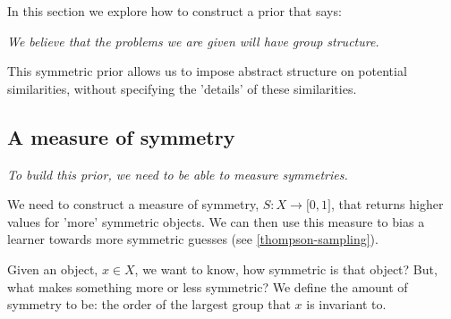 In this section we explore how to construct a prior that says:

\begin{displayquote}
	\textsl{We believe that the problems we are given will have group structure.}
\end{displayquote}

This symmetric prior allows us to impose abstract structure on potential similarities, without specifying
the 'details' of these similarities.

%
%
%


\subsection{A measure of symmetry}\label{measure-symmetry}

\begin{displayquote}
	\textsl{To build this prior, we need to be able to measure symmetries.}
\end{displayquote}

We need to construct a measure of symmetry, $S: X \to \mathbb [0, 1]$, that returns higher values for 'more' symmetric objects.
We can then use this measure to bias a learner towards more symmetric guesses (see \ref{thompson-sampling}).

Given an object, $x \in X$, we want to know, how symmetric is that object?
But, what makes something more or less symmetric?
We define the amount of symmetry to be: the order \footnotemark of the largest group that $x$ is invariant to.

